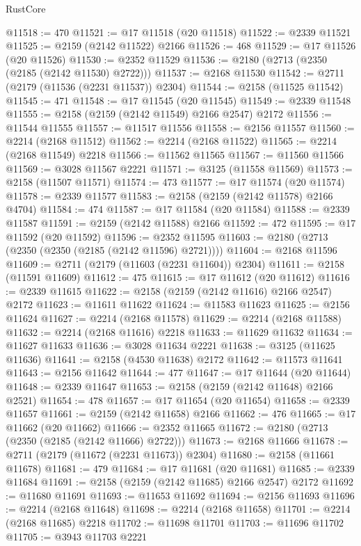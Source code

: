 \begin{lexlean}{RustCore}
\begin{coremodule}
@11518 := 470
@11521 := @17 @11518 (@20 @11518)
@11522 := @2339 @11521
@11525 := @2159 (@2142 @11522) @2166
@11526 := 468
@11529 := @17 @11526 (@20 @11526)
@11530 := @2352 @11529
@11536 := @2180 (@2713 (@2350 (@2185 (@2142 @11530) @2722)))
@11537 := @2168 @11530
@11542 := @2711 (@2179 (@11536 (@2231 @11537)) @2304)
@11544 := @2158 (@11525 @11542)
@11545 := 471
@11548 := @17 @11545 (@20 @11545)
@11549 := @2339 @11548
@11555 := @2158 (@2159 (@2142 @11549) @2166 @2547) @2172
@11556 := @11544 @11555
@11557 := @11517 @11556
@11558 := @2156 @11557
@11560 := @2214 (@2168 @11512)
@11562 := @2214 (@2168 @11522)
@11565 := @2214 (@2168 @11549) @2218
@11566 := @11562 @11565
@11567 := @11560 @11566
@11569 := @3028 @11567 @2221
@11571 := @3125 (@11558 @11569)
@11573 := @2158 (@11507 @11571)
@11574 := 473
@11577 := @17 @11574 (@20 @11574)
@11578 := @2339 @11577
@11583 := @2158 (@2159 (@2142 @11578) @2166 @4704)
@11584 := 474
@11587 := @17 @11584 (@20 @11584)
@11588 := @2339 @11587
@11591 := @2159 (@2142 @11588) @2166
@11592 := 472
@11595 := @17 @11592 (@20 @11592)
@11596 := @2352 @11595
@11603 := @2180 (@2713 (@2350 (@2350 (@2185 (@2142 @11596) @2721))))
@11604 := @2168 @11596
@11609 := @2711 (@2179 (@11603 (@2231 @11604)) @2304)
@11611 := @2158 (@11591 @11609)
@11612 := 475
@11615 := @17 @11612 (@20 @11612)
@11616 := @2339 @11615
@11622 := @2158 (@2159 (@2142 @11616) @2166 @2547) @2172
@11623 := @11611 @11622
@11624 := @11583 @11623
@11625 := @2156 @11624
@11627 := @2214 (@2168 @11578)
@11629 := @2214 (@2168 @11588)
@11632 := @2214 (@2168 @11616) @2218
@11633 := @11629 @11632
@11634 := @11627 @11633
@11636 := @3028 @11634 @2221
@11638 := @3125 (@11625 @11636)
@11641 := @2158 (@4530 @11638) @2172
@11642 := @11573 @11641
@11643 := @2156 @11642
@11644 := 477
@11647 := @17 @11644 (@20 @11644)
@11648 := @2339 @11647
@11653 := @2158 (@2159 (@2142 @11648) @2166 @2521)
@11654 := 478
@11657 := @17 @11654 (@20 @11654)
@11658 := @2339 @11657
@11661 := @2159 (@2142 @11658) @2166
@11662 := 476
@11665 := @17 @11662 (@20 @11662)
@11666 := @2352 @11665
@11672 := @2180 (@2713 (@2350 (@2185 (@2142 @11666) @2722)))
@11673 := @2168 @11666
@11678 := @2711 (@2179 (@11672 (@2231 @11673)) @2304)
@11680 := @2158 (@11661 @11678)
@11681 := 479
@11684 := @17 @11681 (@20 @11681)
@11685 := @2339 @11684
@11691 := @2158 (@2159 (@2142 @11685) @2166 @2547) @2172
@11692 := @11680 @11691
@11693 := @11653 @11692
@11694 := @2156 @11693
@11696 := @2214 (@2168 @11648)
@11698 := @2214 (@2168 @11658)
@11701 := @2214 (@2168 @11685) @2218
@11702 := @11698 @11701
@11703 := @11696 @11702
@11705 := @3943 @11703 @2221

\end{coremodule}
\end{lexlean}
